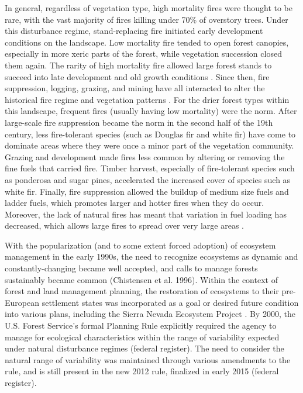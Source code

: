 \documentclass[12pt]{article}
\begin{document}
\begin{spacing}{1}
In general, regardless of vegetation type, high mortality fires were thought to be rare, with the vast majority of fires killing under 70\% of overstory trees. Under this disturbance regime, stand-replacing fire initiated early development conditions on the landscape. Low mortality fire tended to open forest canopies, especially in more xeric parts of the forest, while vegetation succession closed them again. The rarity of high mortality fire allowed large forest stands to succeed into late development and old growth conditions \citep{SNEP1996,Mallek2013,Safford2014,SNEP1996a}. Since then, fire suppression, logging, grazing, and mining have all interacted to alter the historical fire regime and vegetation patterns \citep{Stephens2015,Knapp2013}. For the drier forest types within this landscape, frequent fires (usually having low mortality) were the norm. After large-scale fire suppression became the norm in the second half of the 19th century, less fire-tolerant species (such as Douglas fir and white fir) have come to dominate areas where they were once a minor part of the vegetation community. Grazing and development made fires less common by altering or removing the fine fuels that carried fire. Timber harvest, especially of fire-tolerant species such as ponderosa and sugar pines, accelerated the increased cover of species such as white fir. Finally, fire suppression allowed the buildup of medium size fuels and ladder fuels, which promotes larger and hotter fires when they do occur. Moreover, the lack of natural fires has meant that variation in fuel loading has decreased, which allows large fires to spread over very large areas \citep{Hessburg2005}.



With the popularization (and to some extent forced adoption) of ecosystem management in the early 1990s, the need to recognize ecosystems as dynamic and constantly-changing became well accepted, and calls to manage forests sustainably became common (Chistensen et al. 1996). Within the context of forest and land management planning, the restoration of ecosystems to their pre-European settlement states was incorporated as a goal or desired future condition into various plans, including the Sierra Nevada Ecosystem Project \cite{SNEP1996a}. By 2000, the U.S. Forest Service's formal Planning Rule explicitly required the agency to manage for ecological characteristics within the range of variability expected under natural disturbance regimes (federal register). The need to consider the natural range of variability was maintained through various amendments to the rule, and is still present in the new 2012 rule, finalized in early 2015 (federal register). 



\end{spacing}
\end{document}
